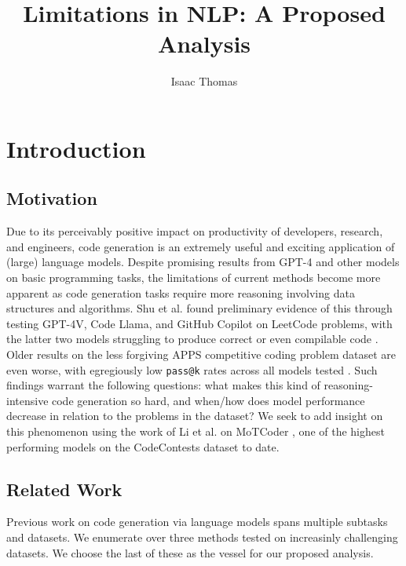 \documentclass[10pt]{article}
\title{Limitations in NLP: A Proposed Analysis}
\author{Isaac Thomas}
\newcommand{\code}[1]{\texttt{#1}}
\theoremstyle{definition}
\begin{document}
\maketitle
\section{Introduction}
\subsection{Motivation}
\noindent Due to its perceivably positive impact on productivity of developers, research, and engineers, code generation is an extremely useful and exciting application of (large) language models. Despite promising results from GPT-4 \cite{gpt4} and other models on basic programming tasks, the limitations of current methods become more apparent as code generation tasks require more reasoning involving data structures and algorithms. Shu et al. found preliminary evidence of this through testing GPT-4V, Code Llama, and GitHub Copilot on LeetCode problems, with the latter two models struggling to produce correct or even compilable code \cite{llmeval1}. Older results on the less forgiving APPS competitive coding problem dataset are even worse, with egregiously low \code{pass@k} rates across all models tested \cite{paperswithcode}. Such findings warrant the following questions: what makes this kind of reasoning-intensive code generation so hard, and when/how does model performance decrease in relation to the problems in the dataset? We seek to add insight on this phenomenon using the work of Li et al. on MoTCoder \cite{motcoder}, one of the highest performing models on the CodeContests dataset \cite{alphacode} to date.

\subsection{Related Work}
\noindent Previous work on code generation via language models spans multiple subtasks and datasets. We enumerate over three methods tested on increasinly challenging datasets. We choose the last of these as the vessel for our proposed analysis.
\end{document}
